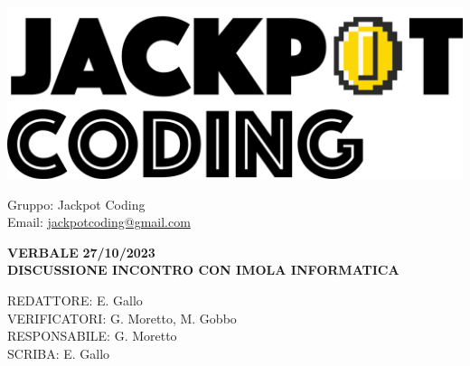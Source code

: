 \documentclass[5pt]{article}
\begin{document}
\begin{minipage}[t]{0.50\textwidth}
    \begin{flushleft}
        \hspace{10pt}
        \includegraphics[scale=0.65]{jackpot-logo.png} 
    \end{flushleft}
\end{minipage}
\hspace{-60pt} %
\begin{flushright}
    \begin{minipage}[t]{0.50\textwidth}
        \begin{flushright}
            Gruppo: {\Large Jackpot Coding}\\
            Email: \href{mailto:jackpotcoding@gmail.com}{jackpotcoding@gmail.com}
        \end{flushright}
    \end{minipage}
\end{flushright}

\vspace{24pt}

\begin{center}
    \textbf{\large VERBALE }
    \textbf{\large 27/10/2023} \\
    \textbf{\Large DISCUSSIONE INCONTRO CON IMOLA INFORMATICA}
\end{center}

\vspace{13pt}

\begin{flushleft}
    \begin{spacing}{1.5}
        REDATTORE: E. Gallo\\%
        VERIFICATORI: G. Moretto, M. Gobbo \\
        RESPONSABILE: G. Moretto\\%
        \vspace{7pt}
        SCRIBA: E. Gallo\\%
    \end{spacing}
\end{flushleft}
\end{document}
